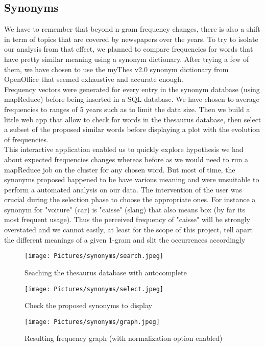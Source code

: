 \subsection{Synonyms}

We have to remember that beyond n-gram frequency changes, there is also a shift in term of topics that are covered by newspapers over the years. To try to isolate our analysis from that effect, we planned to compare frequencies for words that have pretty similar meaning using a synonym dictionary. After trying a few of them, we have chosen to use the myThes v2.0 synonym dictionary from OpenOffice that seemed exhaustive and accurate enough. \\

Frequency vectors were generated for every entry in the synonym database (using mapReduce) before being inserted in a SQL database. We have chosen to average frequencies to ranges of 5 years such as to limit the data size. Then we build a little web app that allow to check for words in the thesaurus database, then select a subset of the proposed similar words before displaying a plot with the evolution of frequencies.\\

This interactive application enabled us to quickly explore hypothesis we had about expected frequencies changes whereas before as we would need to run a mapReduce job on the cluster for any chosen word. But most of time, the synonyms proposed happened to be have various meaning and were unsuitable to perform a automated analysis on our data. The intervention of the user was crucial during the selection phase to choose the appropriate ones. For instance a synonym for "voiture" (car) is "caisse" (slang) that also means box (by far its most frequent usage). Thus the perceived frequency of "caisse" will be strongly overstated and we cannot easily, at least for the scope of this project, tell apart the different meanings of a given 1-gram and slit the occurrences accordingly

\begin{figure}[H]
	\centering
        \texttt{[image: Pictures/synonyms/search.jpeg]}
        \caption{Seaching the thesaurus database with autocomplete}
        \label{search}
\end{figure}
\begin{figure}[H]
	\centering
        \texttt{[image: Pictures/synonyms/select.jpeg]}
        \caption{Check the proposed synonyms to display}
        \label{select}
\end{figure}

\begin{figure}[H]
	\centering
        \texttt{[image: Pictures/synonyms/graph.jpeg]}
        \caption{Resulting frequency graph (with normalization option enabled)}
        \label{graph}
\end{figure}
